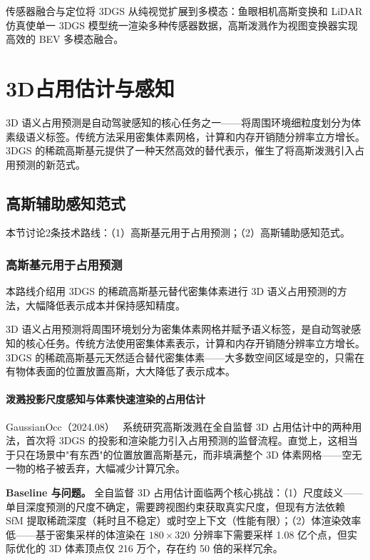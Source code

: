 \begin{takeaway}
传感器融合与定位将 3DGS 从纯视觉扩展到多模态：鱼眼相机高斯变换和 LiDAR 仿真使单一 3DGS 模型统一渲染多种传感器数据，高斯泼溅作为视图变换器实现高效的 BEV 多模态融合。
\end{takeaway}

\section{3D占用估计与感知}
\label{sec:18_5}

3D 语义占用预测是自动驾驶感知的核心任务之一——将周围环境细粒度划分为体素级语义标签。传统方法采用密集体素网格，计算和内存开销随分辨率立方增长。3DGS 的稀疏高斯基元提供了一种天然高效的替代表示，催生了将高斯泼溅引入占用预测的新范式。

\subsection{高斯辅助感知范式}
\label{ss:18_7}

本节讨论2条技术路线：（1）高斯基元用于占用预测；（2）高斯辅助感知范式。

\subsubsection{高斯基元用于占用预测}

本路线介绍用 3DGS 的稀疏高斯基元替代密集体素进行 3D 语义占用预测的方法，大幅降低表示成本并保持感知精度。

3D 语义占用预测将周围环境划分为密集体素网格并赋予语义标签，是自动驾驶感知的核心任务。传统方法使用密集体素表示，计算和内存开销随分辨率立方增长。3DGS 的稀疏高斯基元天然适合替代密集体素——大多数空间区域是空的，只需在有物体表面的位置放置高斯，大大降低了表示成本。

\paragraph{泼溅投影尺度感知与体素快速渲染的占用估计}

GaussianOcc（2024.08）~\cite{2408_11447} 系统研究高斯泼溅在全自监督 3D 占用估计中的两种用法，首次将 3DGS 的投影和渲染能力引入占用预测的监督流程。直觉上，这相当于只在场景中"有东西"的位置放置高斯基元，而非填满整个 3D 体素网格——空无一物的格子被丢弃，大幅减少计算冗余。

\textbf{Baseline 与问题。} 全自监督 3D 占用估计面临两个核心挑战：（1）尺度歧义——单目深度预测的尺度不确定，需要跨视图约束获取真实尺度，但现有方法依赖 SfM 提取稀疏深度（耗时且不稳定）或时空上下文（性能有限）；（2）体渲染效率低——基于密集采样的体渲染在 $180 \times 320$ 分辨率下需要采样 1.08 亿个点，但实际优化的 3D 体素顶点仅 216 万个，存在约 50 倍的采样冗余。

